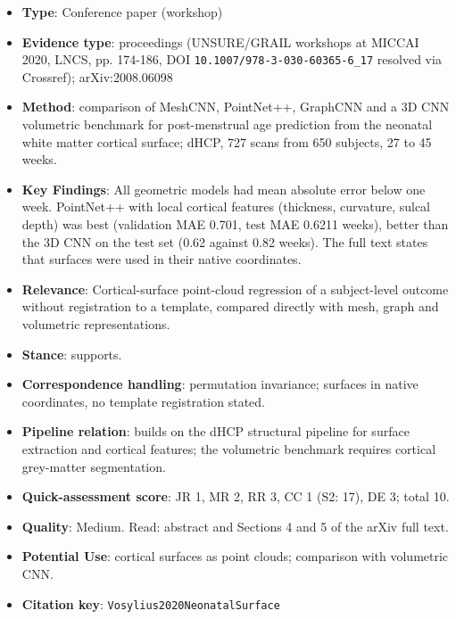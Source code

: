 \documentclass[journal,onecolumn]{IEEEtran}
\begin{document}
\begin{itemize}

\item{} \textbf{Type}: Conference paper (workshop)

\item{} \textbf{Evidence type}: proceedings (UNSURE/GRAIL workshops at MICCAI 2020, LNCS, pp. 174-186, DOI \nolinkurl{10.1007/978-3-030-60365-6_17} resolved via Crossref); arXiv:2008.06098

\item{} \textbf{Method}: comparison of MeshCNN, PointNet++, GraphCNN and a 3D CNN volumetric benchmark for post-menstrual age prediction from the neonatal white matter cortical surface; dHCP, 727 scans from 650 subjects, 27 to 45 weeks.

\item{} \textbf{Key Findings}: All geometric models had mean absolute error below one week. PointNet++ with local cortical features (thickness, curvature, sulcal depth) was best (validation MAE 0.701, test MAE 0.6211 weeks), better than the 3D CNN on the test set (0.62 against 0.82 weeks). The full text states that surfaces were used in their native coordinates.

\item{} \textbf{Relevance}: Cortical-surface point-cloud regression of a subject-level outcome without registration to a template, compared directly with mesh, graph and volumetric representations.

\item{} \textbf{Stance}: supports.

\item{} \textbf{Correspondence handling}: permutation invariance; surfaces in native coordinates, no template registration stated.

\item{} \textbf{Pipeline relation}: builds on the dHCP structural pipeline for surface extraction and cortical features; the volumetric benchmark requires cortical grey-matter segmentation.

\item{} \textbf{Quick-assessment score}: JR 1, MR 2, RR 3, CC 1 (S2: 17), DE 3; total 10.

\item{} \textbf{Quality}: Medium. Read: abstract and Sections 4 and 5 of the arXiv full text.

\item{} \textbf{Potential Use}: cortical surfaces as point clouds; comparison with volumetric CNN.

\item{} \textbf{Citation key}: \texttt{Vosylius2020NeonatalSurface}

\end{itemize}
\end{document}
